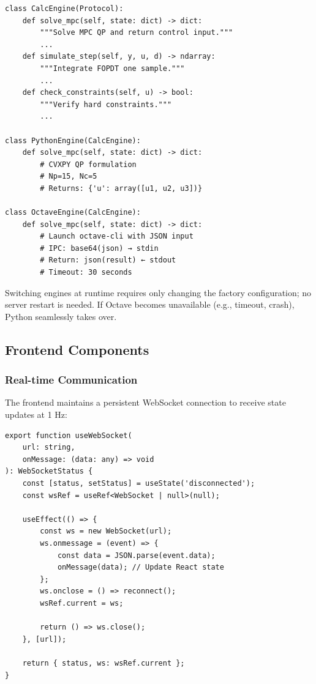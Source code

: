 \documentclass[conference]{IEEEtran}
\begin{document}
\begin{lstlisting}[caption=Engine Factory (Python)]
class CalcEngine(Protocol):
    def solve_mpc(self, state: dict) -> dict:
        """Solve MPC QP and return control input."""
        ...
    def simulate_step(self, y, u, d) -> ndarray:
        """Integrate FOPDT one sample."""
        ...
    def check_constraints(self, u) -> bool:
        """Verify hard constraints."""
        ...

class PythonEngine(CalcEngine):
    def solve_mpc(self, state: dict) -> dict:
        # CVXPY QP formulation
        # Np=15, Nc=5
        # Returns: {'u': array([u1, u2, u3])}

class OctaveEngine(CalcEngine):
    def solve_mpc(self, state: dict) -> dict:
        # Launch octave-cli with JSON input
        # IPC: base64(json) → stdin
        # Return: json(result) ← stdout
        # Timeout: 30 seconds
\end{lstlisting}

Switching engines at runtime requires only changing the factory configuration; no server restart is needed. If Octave becomes unavailable (e.g., timeout, crash), Python seamlessly takes over.

\subsection{Frontend Components}

\subsubsection{Real-time Communication}

The frontend maintains a persistent WebSocket connection to receive state updates at 1 Hz:

\begin{lstlisting}[caption=WebSocket Hook (React/TypeScript)]
export function useWebSocket(
    url: string,
    onMessage: (data: any) => void
): WebSocketStatus {
    const [status, setStatus] = useState('disconnected');
    const wsRef = useRef<WebSocket | null>(null);

    useEffect(() => {
        const ws = new WebSocket(url);
        ws.onmessage = (event) => {
            const data = JSON.parse(event.data);
            onMessage(data); // Update React state
        };
        ws.onclose = () => reconnect();
        wsRef.current = ws;

        return () => ws.close();
    }, [url]);

    return { status, ws: wsRef.current };
}
\end{lstlisting}
\end{document}
